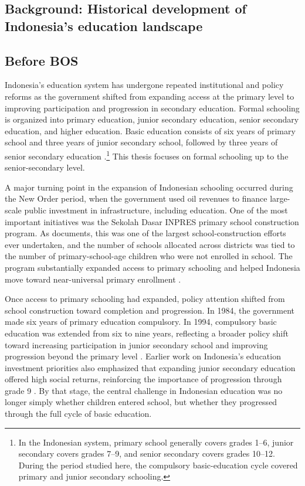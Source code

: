 \documentclass[a4paper, 12pt]{article}
\begin{document}
\begin{doublespacing}
\section[Background: Historical development of Indonesia's education landscape]{Background: Historical development of \\ Indonesia's education landscape}
\subsection{Before BOS}
Indonesia's education system has undergone repeated institutional and policy reforms as the government shifted from expanding access at the primary level to improving participation and progression in secondary education. Formal schooling is organized into primary education, junior secondary education, senior secondary education, and higher education. Basic education consists of six years of primary school and three years of junior secondary school, followed by three years of senior secondary education \citep{WorldBank2013}.\footnote{In the Indonesian system, primary school generally covers grades 1--6, junior secondary covers grades 7--9, and senior secondary covers grades 10--12. During the period studied here, the compulsory basic-education cycle covered primary and junior secondary schooling.} This thesis focuses on formal schooling up to the senior-secondary level.

A major turning point in the expansion of Indonesian schooling occurred during the New Order period, when the government used oil revenues to finance large-scale public investment in infrastructure, including education. One of the most important initiatives was the Sekolah Dasar INPRES primary school construction program. As \citet{Duflo2001} documents, this was one of the largest school-construction efforts ever undertaken, and the number of schools allocated across districts was tied to the number of primary-school-age children who were not enrolled in school. The program substantially expanded access to primary schooling and helped Indonesia move toward near-universal primary enrollment \citep{Duflo2001,WorldBank2013}.

Once access to primary schooling had expanded, policy attention shifted from school construction toward completion and progression. In 1984, the government made six years of primary education compulsory. In 1994, compulsory basic education was extended from six to nine years, reflecting a broader policy shift toward increasing participation in junior secondary school and improving progression beyond the primary level \citep{WorldBank2013}. Earlier work on Indonesia's education investment priorities also emphasized that expanding junior secondary education offered high social returns, reinforcing the importance of progression through grade 9 \citep{McMahonBoediono1992}. By that stage, the central challenge in Indonesian education was no longer simply whether children entered school, but whether they progressed through the full cycle of basic education.


\end{doublespacing}
\end{document}
